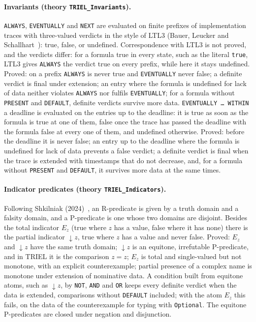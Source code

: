 \documentclass[11pt,a4paper]{article}
\begin{document}
\paragraph{Invariants (theory \texttt{TRIEL\_Invariants}).}
\texttt{ALWAYS}, \texttt{EVENTUALLY} and \texttt{NEXT} are evaluated on finite prefixes of
implementation traces with three-valued verdicts in the style of LTL3 (Bauer, Leucker and
Schallhart~\cite{BauerLeuckerSchallhart2011}): true, false, or undefined. Correspondence
with LTL3 is not proved, and the verdicts differ: for a formula true in every state, such
as the literal \texttt{true}, LTL3 gives \texttt{ALWAYS} the verdict true on every prefix,
while here it stays undefined.
Proved: on a prefix \texttt{ALWAYS} is never true and \texttt{EVENTUALLY} never false; a
definite verdict is final under extension; an entry where the formula is undefined for
lack of data neither violates \texttt{ALWAYS} nor fulfils \texttt{EVENTUALLY}; for a
formula without \texttt{PRESENT} and \texttt{DEFAULT}, definite verdicts survive more data.
\texttt{EVENTUALLY \dots\ WITHIN} a deadline is evaluated on the entries up to the
deadline: it is true as soon as the formula is true at one of them, false once the trace
has passed the deadline with the formula false at every one of them, and undefined
otherwise. Proved: before the deadline it is never false; an entry up to the deadline
where the formula is undefined for lack of data prevents a false verdict; a definite
verdict is final when the trace is extended with timestamps that do not decrease, and,
for a formula without \texttt{PRESENT} and \texttt{DEFAULT}, it survives more data at
the same times.

\paragraph{Indicator predicates (theory \texttt{TRIEL\_Indicators}).}
Following Shkilniak (2024)~\cite{Shkilniak2024}, an R-predicate is given by a truth domain and a falsity domain,
and a P-predicate is one whose two domains are disjoint. Besides the total indicator $E_z$
(true where $z$ has a value, false where it has none) there is the partial indicator
$\downarrow z$, true where $z$ has a value and never false. Proved: $E_z$ and
$\downarrow z$ have the same truth domain; $\downarrow z$ is an equitone, irrefutable
P-predicate, and in TRIEL it is the comparison $z = z$; $E_z$ is total and single-valued
but not monotone, with an explicit counterexample; partial presence of a complex name is
monotone under extension of nominative data. A condition built from equitone atoms,
such as $\downarrow z$, by \texttt{NOT}, \texttt{AND} and \texttt{OR} keeps every
definite verdict when the data is extended, comparisons without \texttt{DEFAULT} included; with the atom $E_z$ this fails, on the data of
the counterexample for typing with \texttt{Optional}. The equitone P-predicates are
closed under negation and disjunction.
\end{document}
